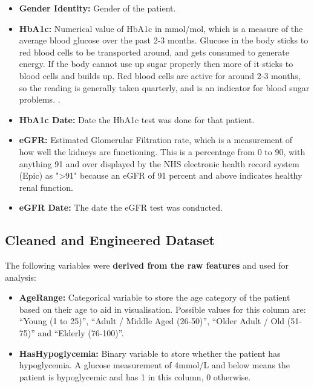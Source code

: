 {\begin{itemize}
        \item \textbf{Gender Identity:} Gender of the patient.
        \item \textbf{HbA1c:} Numerical value of HbA1c in mmol/mol, which is a measure of the average blood glucose over the past 2-3 months. Glucose in the body sticks to red blood cells to be transported around, and gets consumed to generate energy. If the body cannot use up sugar properly then more of it sticks to blood cells and builds up. Red blood cells are active for around 2-3 months, so the reading is generally taken quarterly, and is an indicator for blood sugar problems. \cite{whatishba1c}.  
        \item \textbf{HbA1c Date:} Date the HbA1c test was done for that patient.
        \item \textbf{eGFR:} Estimated Glomerular Filtration rate, which is a measurement of how well the kidneys are functioning. This is a percentage from 0 to 90, with anything 91 and over displayed by the NHS electronic health record system (Epic) as "\textgreater91" because an eGFR of 91 percent and above indicates healthy renal function.
        \item \textbf{eGFR Date:} The date the eGFR test was conducted. 
    \end{itemize}

    \subsection{Cleaned and Engineered Dataset}\label{sec:derivedData}
    \vspace{10pt}
    The following variables were \textbf{derived from the raw features} and used for analysis: 
    
    \begin{itemize}
        \item \textbf{Age\textunderscore Range:}  Categorical variable to store the age category of the patient based on their age to aid in visualisation. Possible values for this column are: ``Young (1 to 25)'', ``Adult / Middle Aged (26-50)'', ``Older Adult / Old (51-75)'' and ``Elderly (76-100)''.

        \item \textbf{Has\textunderscore Hypoglycemia:} Binary variable to store whether the patient has hypoglycemia. A glucose measurement of 4mmol/L and below means the patient is hypoglycemic and has 1 in this column, 0 otherwise. 


\end{itemize}}
